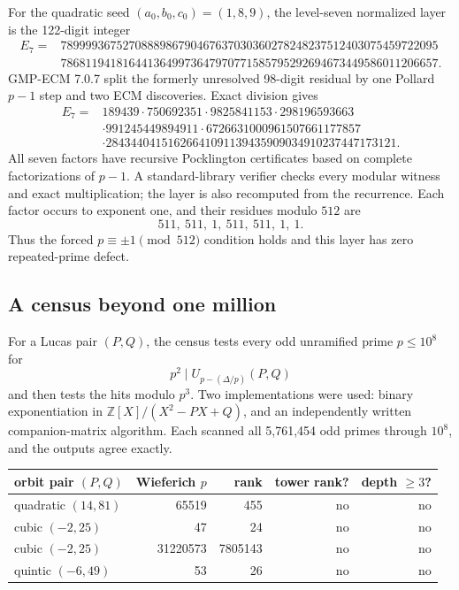 \documentclass[11pt]{article}
\theoremstyle{definition}
\theoremstyle{remark}
\begin{document}
For the quadratic seed \((a_0,b_0,c_0)=(1,8,9)\), the level-seven
normalized layer is the 122-digit integer
\begin{align*}
 E_7={}&7899993675270888986790467637030360278248237512403075459722095\\
      &7868119418164413649973647970771585795292694673449586011206657.
\end{align*}
GMP-ECM 7.0.7 split the formerly unresolved 98-digit residual by one
Pollard $p-1$ step and two ECM discoveries.  Exact division gives
\begin{align*}
E_7={}&189439\cdot750692351\cdot9825841153\cdot298196593663\\
&\cdot991245449894911\cdot6726631000961507661177857\\
&\cdot28434404151626641091139435909034910237447173121.
\tag{8.1}
\end{align*}
All seven factors have recursive Pocklington certificates based on complete
factorizations of \(p-1\).  A standard-library verifier checks every modular
witness and exact multiplication; the layer is also recomputed from the
recurrence.  Each factor occurs to exponent one, and their residues modulo
\(512\) are
\[
 511,\ 511,\ 1,\ 511,\ 511,\ 1,\ 1.
\]
Thus the forced \(p\equiv\pm1\pmod{512}\) condition holds and this layer
has zero repeated-prime defect.

\subsection{A census beyond one million}

For a Lucas pair \((P,Q)\), the census tests every odd unramified prime
\(p\le10^8\) for
\[
 p^2\mid U_{p-(\Delta/p)}(P,Q)
\]
and then tests the hits modulo $p^3$.  Two implementations were used:
binary exponentiation in \(\mathbb Z[X]/(X^2-PX+Q)\), and an independently
written companion-matrix algorithm.  Each scanned all 5,761,454 odd primes
through \(10^8\), and the outputs agree exactly.

\begin{center}
\begin{tabular}{@{}lrrrr@{}}
\toprule
orbit pair \((P,Q)\) & Wieferich \(p\) & rank & tower rank? & depth \(\ge3\)?\\
\midrule
quadratic \((14,81)\) & 65519 & 455 & no & no\\
cubic \((-2,25)\) & 47 & 24 & no & no\\
cubic \((-2,25)\) & 31220573 & 7805143 & no & no\\
quintic \((-6,49)\) & 53 & 26 & no & no\\
\bottomrule
\end{tabular}
\end{center}
\end{document}
